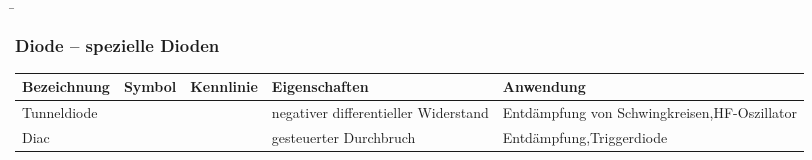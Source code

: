 \begin{frame}
    \b{
        \frametitle{Diode -- spezielle Dioden}
        \begin{table}[H]
            \centering 
            \begin{tabular}{ |p{2.1cm}|p{1.4cm}|p{3.2cm}|p{2.8cm}|p{3cm}| }
                \hline
                \textbf{Bezeichnung} & \textbf{Symbol} & \textbf{Kennlinie} & \textbf{Eigenschaften} & \textbf{Anwendung} \\
                \hline
                Tunnel\-diode
                &
                \begin{minipage}[t][2.6cm][c]{1.4cm}
                    \centering 
                \end{minipage}
                & 
                \begin{minipage}[t][2.6cm][c]{3.3cm}
                    \centering 
                \end{minipage}
                & 
                negativer differentieller Widerstand &
                Entdämpfung von Schwingkreisen,\newline HF-Oszillator\\
                \hline
                Diac
                &
                \begin{minipage}[t][2.6cm][c]{1.4cm}
                    \centering 
                \end{minipage}
                & 
                \begin{minipage}[t][2.6cm][c]{3.3cm}
                    \centering 
                \end{minipage}
                & 
                gesteuerter Durchbruch & 
                Entdämpfung,\newline Triggerdiode\\
                \hline
        \end{tabular}
    \end{table}
    }

\end{frame}

